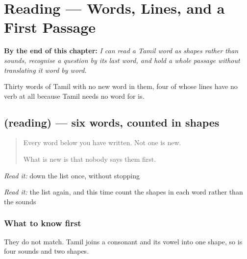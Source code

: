
\chapter{Reading — Words, Lines, and a First Passage}
\label{ch:ta-mudhal-vaasippu}

\begin{chapteropening}
\textbf{By the end of this chapter:} \emph{I can read a Tamil word as shapes rather than sounds, recognise a question by its last word, and hold a whole passage without translating it word by word.}

Thirty words of Tamil with no new word in them, four of whose lines have no verb at all because Tamil needs no word for is.
\end{chapteropening}

\section[(reading)]{(reading) — six words, counted in shapes}

\label{lesson:TA-C84-words}



\begin{quote}
Every word below you have written. Not one is new.

What is new is that nobody says them first.
\end{quote}

\begin{tcolorbox}[breakable,skin=enhanced,colback=orange!6,colframe=orange!45!black,boxrule=0.5pt,arc=1mm,left=6pt,right=6pt,top=4pt,bottom=4pt,fonttitle=\bfseries,title={Read this}]
\begin{quote}
     
\end{quote}

\emph{Read it:} down the list once, without stopping

\emph{Read it:} the list again, and this time count the shapes in each word rather than the sounds
\end{tcolorbox}

\subsection*{What to know first}
They do not match. Tamil joins a consonant and its vowel into one shape, so \textbf{} is four sounds and two shapes.

